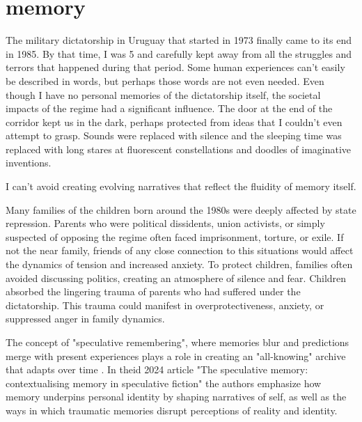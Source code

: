 \chapter*{memory}
\begin{center}
\vspace{2cm}
\begin{flushright}
\large
\end{flushright}
\vspace{2cm}
\end{center}
\normalsize

The military dictatorship in Uruguay that started in 1973 finally came to its end in 1985. By that time, I was 5 and carefully kept away from all the struggles and terrors that happened during that period. Some human experiences can't easily be described in words, but perhaps those words are not even needed. Even though I have no personal memories of the dictatorship itself, the societal impacts of the regime had a significant influence. The door at the end of the corridor kept us in the dark, perhaps protected from ideas that I couldn't even attempt to grasp. Sounds were replaced with silence and the sleeping time was replaced with long stares at fluorescent constellations and doodles of imaginative inventions.    

I can't avoid creating evolving narratives that reflect the fluidity of memory itself. 

Many families of the children born around the 1980s were deeply affected by state repression. Parents who were political dissidents, union activists, or simply suspected of opposing the regime often faced imprisonment, torture, or exile. If not the near family, friends of any close connection to this situations would affect the dynamics of tension and increased anxiety. To protect children, families often avoided discussing politics, creating an atmosphere of silence and fear. Children absorbed the lingering trauma of parents who had suffered under the dictatorship. This trauma could manifest in overprotectiveness, anxiety, or suppressed anger in family dynamics.

The concept of "speculative remembering", where memories blur and predictions merge with present experiences plays a role in creating an "all-knowing" archive that adapts over time \citep{dutt2024}. In theid 2024 article "The speculative memory: contextualising memory in speculative fiction" the authors emphasize how memory underpins personal identity by shaping narratives of self, as well as the ways in which traumatic memories disrupt perceptions of reality and identity. 

